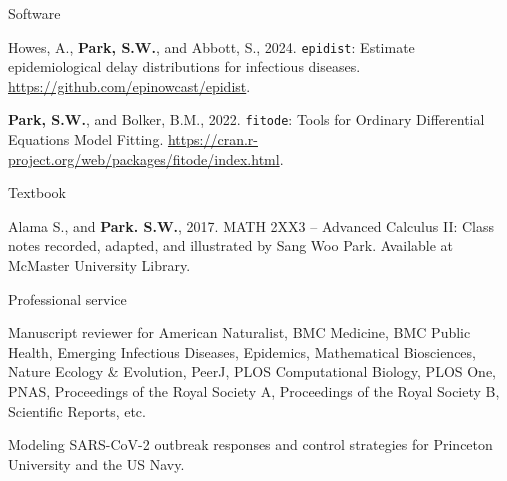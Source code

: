 \documentclass[
	11pt, %
]{resume} %
\begin{document}
\begin{rSection}{Software}

Howes, A., \textbf{Park, S.W.}, and Abbott, S., 2024. \texttt{epidist}: Estimate epidemiological delay distributions for infectious diseases. \url{https://github.com/epinowcast/epidist}.

\textbf{Park, S.W.}, and Bolker, B.M., 2022. \texttt{fitode}: Tools for Ordinary Differential Equations Model Fitting. \url{https://cran.r-project.org/web/packages/fitode/index.html}.

\end{rSection}

\begin{rSection}{Textbook}

Alama S., and \textbf{Park. S.W.}, 2017. MATH 2XX3 -- Advanced Calculus II: Class notes recorded, adapted, and illustrated by Sang Woo Park. Available at McMaster University Library.

\end{rSection}

\begin{rSection}{Professional service}

Manuscript reviewer for American Naturalist, BMC Medicine, BMC Public Health, Emerging Infectious Diseases, Epidemics, Mathematical Biosciences, Nature Ecology \& Evolution, PeerJ, PLOS Computational Biology, PLOS One, PNAS, Proceedings of the Royal Society A, Proceedings of the Royal Society B, Scientific Reports, etc.

Modeling SARS-CoV-2 outbreak responses and control strategies for Princeton University and the US Navy. 

\end{rSection}
\end{document}
